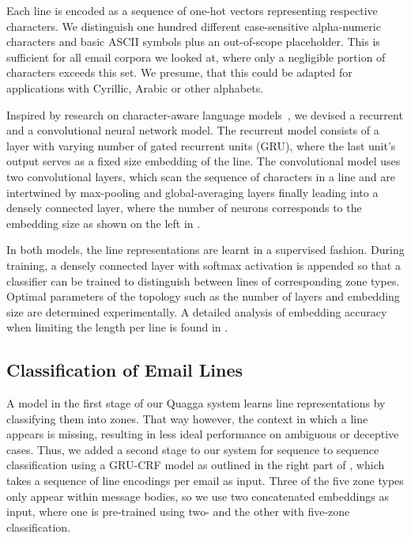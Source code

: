 \documentclass{llncs}
\begin{document}
Each line is encoded as a sequence of one-hot vectors representing respective characters.
We distinguish one hundred different case-sensitive alpha-numeric characters and basic ASCII symbols plus an out-of-scope placeholder.
This is sufficient for all email corpora we looked at, where only a negligible portion of characters exceeds this set.
We presume, that this could be adapted for applications with Cyrillic, Arabic or other alphabets.

Inspired by research on character-aware language models~\cite{char_nn}, we devised a recurrent and a convolutional neural network model.
The recurrent model consists of a layer with varying number of gated recurrent units (GRU), where the last unit's output serves as a fixed size embedding of the line.
The convolutional model uses two convolutional layers, which scan the sequence of characters in a line and are intertwined by max-pooling and global-averaging layers finally leading into a densely connected layer, where the number of neurons corresponds to the embedding size as shown on the left in .

In both models, the line representations are learnt in a supervised fashion.
During training, a densely connected layer with softmax activation is appended so that a classifier can be trained to distinguish between lines of corresponding zone types.
Optimal parameters of the topology such as the number of layers and embedding size are determined experimentally.
A detailed analysis of embedding accuracy when limiting the length per line is found in .



\subsection{Classification of Email Lines}
A model in the first stage of our Quagga system learns line representations by classifying them into zones.
That way however, the context in which a line appears is missing, resulting in less ideal performance on ambiguous or deceptive cases.
Thus, we added a second stage to our system for sequence to sequence classification using a GRU-CRF model as outlined in the right part of , which takes a sequence of line encodings per email as input.
Three of the five zone types only appear within message bodies, so we use two  concatenated embeddings as input, where one is pre-trained using two- and the other with five-zone classification.
\end{document}
